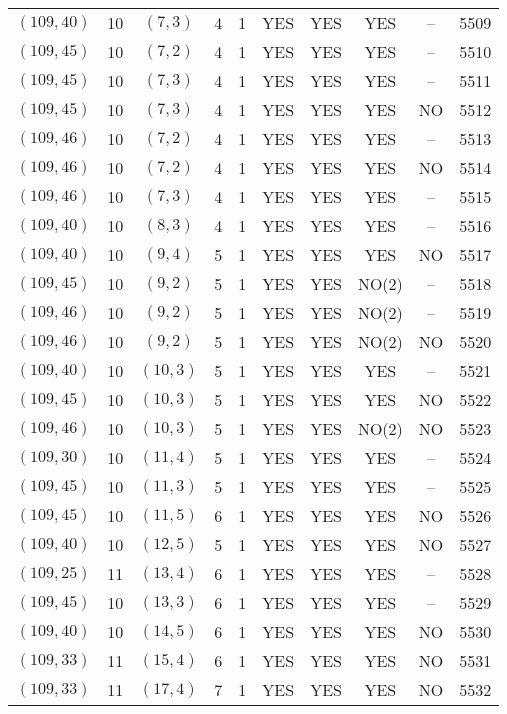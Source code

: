 \begin{longtable}{|c|c|c|c|c|c|c|c|c|c|}
$(109, 40)$ & 10 & $(7, 3)$ & 4 & 1 & YES & YES & YES & -- & 5509\\
$(109, 45)$ & 10 & $(7, 2)$ & 4 & 1 & YES & YES & YES & -- & 5510\\
$(109, 45)$ & 10 & $(7, 3)$ & 4 & 1 & YES & YES & YES & -- & 5511\\
$(109, 45)$ & 10 & $(7, 3)$ & 4 & 1 & YES & YES & YES & NO & 5512\\
$(109, 46)$ & 10 & $(7, 2)$ & 4 & 1 & YES & YES & YES & -- & 5513\\
$(109, 46)$ & 10 & $(7, 2)$ & 4 & 1 & YES & YES & YES & NO & 5514\\
$(109, 46)$ & 10 & $(7, 3)$ & 4 & 1 & YES & YES & YES & -- & 5515\\
$(109, 40)$ & 10 & $(8, 3)$ & 4 & 1 & YES & YES & YES & -- & 5516\\
$(109, 40)$ & 10 & $(9, 4)$ & 5 & 1 & YES & YES & YES & NO & 5517\\
$(109, 45)$ & 10 & $(9, 2)$ & 5 & 1 & YES & YES & NO(2) & -- & 5518\\
$(109, 46)$ & 10 & $(9, 2)$ & 5 & 1 & YES & YES & NO(2) & -- & 5519\\
$(109, 46)$ & 10 & $(9, 2)$ & 5 & 1 & YES & YES & NO(2) & NO & 5520\\
$(109, 40)$ & 10 & $(10, 3)$ & 5 & 1 & YES & YES & YES & -- & 5521\\
$(109, 45)$ & 10 & $(10, 3)$ & 5 & 1 & YES & YES & YES & NO & 5522\\
$(109, 46)$ & 10 & $(10, 3)$ & 5 & 1 & YES & YES & NO(2) & NO & 5523\\
$(109, 30)$ & 10 & $(11, 4)$ & 5 & 1 & YES & YES & YES & -- & 5524\\
$(109, 45)$ & 10 & $(11, 3)$ & 5 & 1 & YES & YES & YES & -- & 5525\\
$(109, 45)$ & 10 & $(11, 5)$ & 6 & 1 & YES & YES & YES & NO & 5526\\
$(109, 40)$ & 10 & $(12, 5)$ & 5 & 1 & YES & YES & YES & NO & 5527\\
$(109, 25)$ & 11 & $(13, 4)$ & 6 & 1 & YES & YES & YES & -- & 5528\\
$(109, 45)$ & 10 & $(13, 3)$ & 6 & 1 & YES & YES & YES & -- & 5529\\
$(109, 40)$ & 10 & $(14, 5)$ & 6 & 1 & YES & YES & YES & NO & 5530\\
$(109, 33)$ & 11 & $(15, 4)$ & 6 & 1 & YES & YES & YES & NO & 5531\\
$(109, 33)$ & 11 & $(17, 4)$ & 7 & 1 & YES & YES & YES & NO & 5532\\

\end{longtable}
